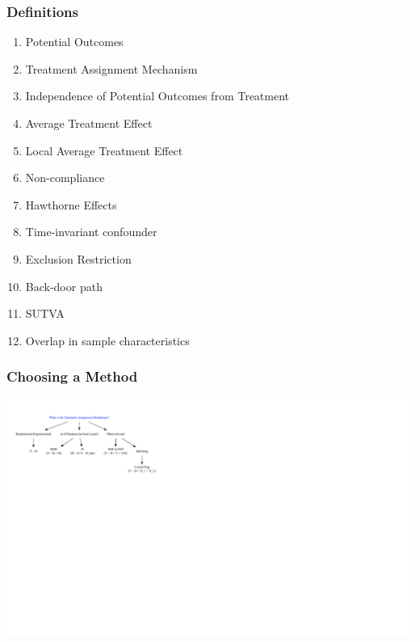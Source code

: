 \documentclass[xcolor=x11names,compress]{beamer}\usepackage[]{graphicx}\usepackage[]{color}
\newenvironment{knitrout}{}{} %
\renewcommand{\(}{\begin{columns}}
\renewcommand{\)}{\end{columns}}
\newcommand{\<}[1]{\begin{column}{#1}}
\renewcommand{\>}{\end{column}}
\begin{document}
\begin{frame}
\frametitle{Definitions}
\begin{multicols}{2}
\begin{enumerate}
\item Potential Outcomes
\pause
\item Treatment Assignment Mechanism
\pause
\item Independence of Potential Outcomes from Treatment
\pause
\item Average Treatment Effect
\pause
\item Local Average Treatment Effect
\pause
\item Non-compliance
\pause
\columnbreak
\item Hawthorne Effects
\pause
\item Time-invariant confounder
\pause
\item Exclusion Restriction
\pause
\item Back-door path
\pause
\item SUTVA
\pause
\item Overlap in sample characteristics
\end{enumerate}
\end{multicols}
\end{frame}

\begin{frame}
\frametitle{Choosing a Method}
\begin{knitrout}
\color{fgcolor}
\includegraphics[width=2.7\linewidth]{figure/Dag1-1} 

\end{knitrout}
\end{frame}
\end{document}
